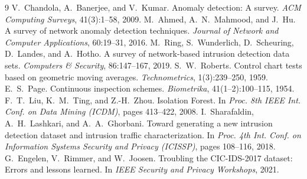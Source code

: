 \documentclass[11pt,a4paper]{article}
\begin{document}
\begin{thebibliography}{9}
\small
{} V.~Chandola, A.~Banerjee, and V.~Kumar. Anomaly detection: A
survey. \emph{ACM Computing Surveys}, 41(3):1--58, 2009.
 M.~Ahmed, A.~N.~Mahmood, and J.~Hu. A survey of network anomaly
detection techniques. \emph{Journal of Network and Computer Applications},
60:19--31, 2016.
 M.~Ring, S.~Wunderlich, D.~Scheuring, D.~Landes, and A.~Hotho. A
survey of network-based intrusion detection data sets. \emph{Computers \&
Security}, 86:147--167, 2019.
 S.~W.~Roberts. Control chart tests based on geometric moving
averages. \emph{Technometrics}, 1(3):239--250, 1959.
 E.~S.~Page. Continuous inspection schemes. \emph{Biometrika},
41(1--2):100--115, 1954.
 F.~T.~Liu, K.~M.~Ting, and Z.-H.~Zhou. Isolation Forest. In
\emph{Proc. 8th IEEE Int. Conf. on Data Mining (ICDM)}, pages 413--422, 2008.
 I.~Sharafaldin, A.~H.~Lashkari, and A.~A.~Ghorbani. Toward
generating a new intrusion detection dataset and intrusion traffic
characterization. In \emph{Proc. 4th Int. Conf. on Information Systems Security
and Privacy (ICISSP)}, pages 108--116, 2018.
 G.~Engelen, V.~Rimmer, and W.~Joosen. Troubling the CIC-IDS-2017
dataset: Errors and lessons learned. In \emph{IEEE Security and Privacy
Workshops}, 2021.
\end{thebibliography}
\end{document}
